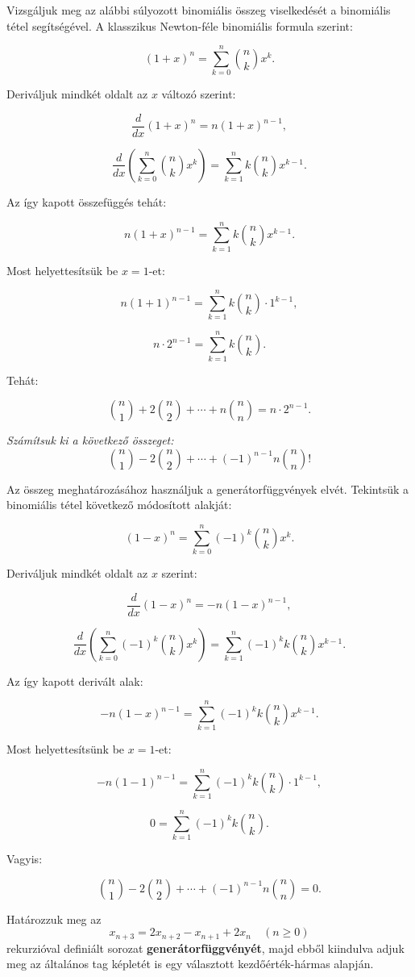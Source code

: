 \begin{solution}
Vizsgáljuk meg az alábbi súlyozott binomiális összeg viselkedését
a binomiális tétel segítségével. A klasszikus Newton-féle binomiális
formula szerint:

\[
(1+x)^{n}=\sum_{k=0}^{n}\binom{n}{k}x^{k}.
\]

Deriváljuk mindkét oldalt az $x$ változó szerint:

\[
\frac{d}{dx}(1+x)^{n}=n(1+x)^{n-1},
\]

\[
\frac{d}{dx}\left(\sum_{k=0}^{n}\binom{n}{k}x^{k}\right)=\sum_{k=1}^{n}k\binom{n}{k}x^{k-1}.
\]

Az így kapott összefüggés tehát:

\[
n(1+x)^{n-1}=\sum_{k=1}^{n}k\binom{n}{k}x^{k-1}.
\]

Most helyettesítsük be $x=1$-et:

\[
n(1+1)^{n-1}=\sum_{k=1}^{n}k\binom{n}{k}\cdot1^{k-1},
\]

\[
n\cdot2^{n-1}=\sum_{k=1}^{n}k\binom{n}{k}.
\]

Tehát:

\[
\binom{n}{1}+2\binom{n}{2}+\cdots+n\binom{n}{n}=n\cdot2^{n-1}.
\]
\end{solution}
\begin{extraproblem}
\textit{\emph{Számítsuk ki a következő összeget:}} 
\[
\binom{n}{1}-2\binom{n}{2}+\cdots+(-1)^{n-1}n\binom{n}{n}!
\]
\end{extraproblem}

\bigskip{}

\begin{solution}
Az összeg meghatározásához használjuk a generátorfüggvények elvét.
Tekintsük a binomiális tétel következő módosított alakját:

\[
(1-x)^{n}=\sum_{k=0}^{n}(-1)^{k}\binom{n}{k}x^{k}.
\]

Deriváljuk mindkét oldalt az $x$ szerint:

\[
\frac{d}{dx}(1-x)^{n}=-n(1-x)^{n-1},
\]

\[
\frac{d}{dx}\left(\sum_{k=0}^{n}(-1)^{k}\binom{n}{k}x^{k}\right)=\sum_{k=1}^{n}(-1)^{k}k\binom{n}{k}x^{k-1}.
\]

Az így kapott derivált alak:

\[
-n(1-x)^{n-1}=\sum_{k=1}^{n}(-1)^{k}k\binom{n}{k}x^{k-1}.
\]

Most helyettesítsünk be $x=1$-et:

\[
-n(1-1)^{n-1}=\sum_{k=1}^{n}(-1)^{k}k\binom{n}{k}\cdot1^{k-1},
\]

\[
0=\sum_{k=1}^{n}(-1)^{k}k\binom{n}{k}.
\]

Vagyis:

\[
\binom{n}{1}-2\binom{n}{2}+\cdots+(-1)^{n-1}n\binom{n}{n}=0.
\]
\end{solution}
\begin{extraproblem}
Határozzuk meg az 
\[
x_{n+3}=2x_{n+2}-x_{n+1}+2x_{n}\quad(n\geq0)
\]
rekurzióval definiált sorozat \textbf{generátorfüggvényét}, majd ebből
kiindulva adjuk meg az általános tag képletét is egy választott kezdőérték-hármas
alapján. 
\end{extraproblem}

